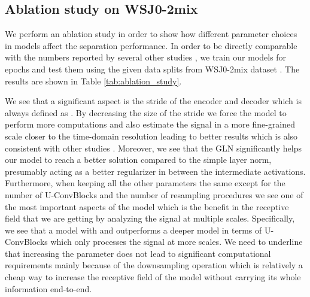\subsection{Ablation study on WSJ0-2mix}
\label{sec:results:ablation}
We perform an ablation study in order to show how different parameter choices in \sudoi models affect the separation performance. In order to be directly comparable with the numbers reported by several other studies  \cite{luo2019convTasNet,luo2019dual,zeghidour2020wavesplit,liu2019DeepCASA}, we train our models for  epochs and test them using the given data splits from WSJ0-2mix dataset \cite{hershey2016deepclustering}. The results are shown in Table \ref{tab:ablation_study}.

We see that a significant aspect is the stride of the encoder and decoder which is always defined as . By decreasing the size of the stride we force the model to perform more computations and also estimate the signal in a more fine-grained scale closer to the time-domain resolution leading to better results which is also consistent with other studies \cite{kavalerov2019universal}. Moreover, we see that the GLN significantly helps our model to reach a better solution compared to the simple layer norm, presumably acting as a better regularizer in between the intermediate activations. Furthermore, when keeping all the other parameters the same except for the number of U-ConvBlocks  and the number of resampling procedures  we see one of the most important aspects of the \sudoi model which is the benefit in the receptive field that we are getting by analyzing the signal at multiple scales. Specifically, we see that a model with  and  outperforms a deeper model in terms of U-ConvBlocks  which only processes the signal at  more scales. We need to underline that increasing the parameter  does not lead to significant computational requirements mainly because of the downsampling operation which is relatively a cheap way to increase the receptive field of the model without carrying its whole information end-to-end.

